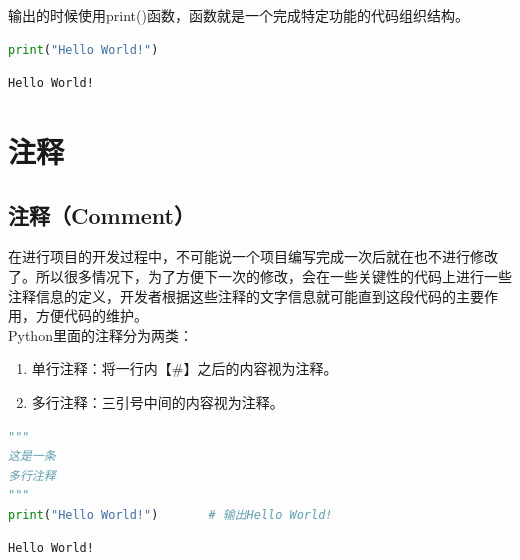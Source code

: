 输出的时候使用print()函数，函数就是一个完成特定功能的代码组织结构。\\


\begin{lstlisting}[language=Python]
print("Hello World!")
\end{lstlisting}

\begin{tcolorbox}
	\begin{verbatim}
Hello World!
\end{verbatim}
\end{tcolorbox}

\newpage

\section{注释}

\subsection{注释（Comment）}

在进行项目的开发过程中，不可能说一个项目编写完成一次后就在也不进行修改了。所以很多情况下，为了方便下一次的修改，会在一些关键性的代码上进行一些注释信息的定义，开发者根据这些注释的文字信息就可能直到这段代码的主要作用，方便代码的维护。\\

Python里面的注释分为两类：

\begin{enumerate}
	\item 单行注释：将一行内【\#】之后的内容视为注释。
	\item 多行注释：三引号中间的内容视为注释。
\end{enumerate}

\vspace{0.5cm}


\begin{lstlisting}[language=Python]
"""
这是一条
多行注释
"""
print("Hello World!")		# 输出Hello World!
\end{lstlisting}

\begin{tcolorbox}
	\begin{verbatim}
Hello World!
\end{verbatim}
\end{tcolorbox}


